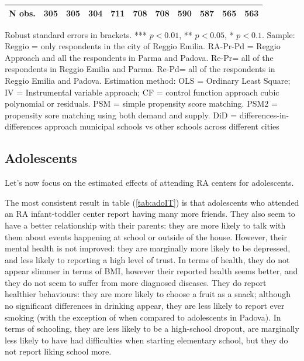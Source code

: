 \documentclass[12pt]{article}
\begin{document}
\begin{table}[ht]
\begin{center}
\begin{adjustbox}{width=1.2\textwidth,center=\textwidth}
\begin{tabular}{l*{10}{c}}
\hline
N obs. &  305 & 305 & 304 & 711 & 708 & 708 & 590 & 587 & 565 & 563 \\
\hline
\end{tabular}
\end{adjustbox}
\end{center}

\begin{footnotesize}
\raggedright{Robust standard errors in brackets. *** $p<0.01$, ** $p<0.05$, * $p<0.1$. Sample: Reggio = only respondents in the city of Reggio Emilia. RA-Pr-Pd = Reggio Approach and all the respondents in Parma and Padova. Re-Pr= all of the respondents in Reggio Emilia and Parma. Re-Pd= all of the respondents in Reggio Emilia and Padova. Estimation method: OLS = Ordinary Least Square; IV = Instrumental variable approach; CF = control function approach cubic polynomial or residuals. PSM = simple propensity score matching. PSM2 = propensity sore matching using both demand and supply. DiD = differences-in-differences approach municipal schools vs other schools across different cities}
\end{footnotesize}
\end{table}

\subsection{Adolescents}
Let's now focus on the estimated effects of attending RA centers for adolescents.

The most consistent result in table (\ref{tab:adoIT}) is that adolescents who attended an RA infant-toddler center report having many more friends. They also seem to have a better relationship with their parents: they are more likely to talk with them about events happening at school or outside of the house. However, their mental health is not improved: they are marginally more likely to be depressed, and less likely to reporting a high level of trust.
In terms of health, they do not appear slimmer in terms of BMI, however their reported health seems better, and they do not seem to suffer from more diagnosed diseases. They do report healthier behaviours: they are more likely to choose a fruit as a snack; although no significant differences in drinking appear, they are less likely to report ever smoking (with the exception of when compared to adolescents in Padova). 
In terms of schooling, they are less likely to be a high-school dropout, are marginally less likely to have had difficulties when starting elementary school, but they do not report liking school more.
\end{document}
